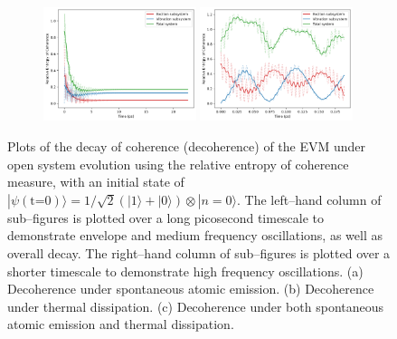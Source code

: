 \documentclass[11pt]{article}
\begin{document}
\begin{figure}[H]
    \vspace{0.8em}

    \begin{subfigure}{\textwidth}
        \centering
        \includegraphics[width=0.49\textwidth]{Research Project/Code/results/ExVib/Open/Coherence/Envelope/coh_both_eg.png}
        \hfill
        \includegraphics[width=0.49\textwidth]{Research Project/Code/results/ExVib/Open/Coherence/Fast/coh_both_eg.png}
        \caption{}
        \label{fig:EVM_OQS_Coh_both_eg}
    \end{subfigure}
    \caption{Plots of the decay of coherence (decoherence) of the EVM under open system evolution using the relative entropy of coherence measure, with an initial state of $|\psi (\text{t=0})\rangle = 1/\sqrt{2}(|1\rangle + |0\rangle)\otimes|n=0\rangle$. The left--hand column of sub--figures is plotted over a long picosecond timescale to demonstrate envelope and medium frequency oscillations, as well as overall decay. The right--hand column of sub--figures is plotted over a shorter timescale to demonstrate high frequency oscillations. (a) Decoherence under spontaneous atomic emission. (b) Decoherence under thermal dissipation. (c) Decoherence under both spontaneous atomic emission and thermal dissipation.}
    \label{fig:EVM_OQS_Coh_eg}
\end{figure}
\end{document}
